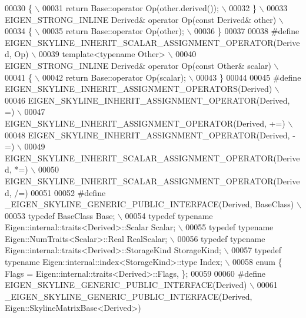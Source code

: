 \begin{DoxyCode}
00030 \textcolor{preprocessor}{\{ \(\backslash\)}
00031 \textcolor{preprocessor}{  return Base::operator Op(other.derived()); \(\backslash\)}
00032 \textcolor{preprocessor}{\} \(\backslash\)}
00033 \textcolor{preprocessor}{EIGEN\_STRONG\_INLINE Derived& operator Op(const Derived& other) \(\backslash\)}
00034 \textcolor{preprocessor}{\{ \(\backslash\)}
00035 \textcolor{preprocessor}{  return Base::operator Op(other); \(\backslash\)}
00036 \textcolor{preprocessor}{\}}
00037 
00038 \textcolor{preprocessor}{#define EIGEN\_SKYLINE\_INHERIT\_SCALAR\_ASSIGNMENT\_OPERATOR(Derived, Op) \(\backslash\)}
00039 \textcolor{preprocessor}{template<typename Other> \(\backslash\)}
00040 \textcolor{preprocessor}{EIGEN\_STRONG\_INLINE Derived& operator Op(const Other& scalar) \(\backslash\)}
00041 \textcolor{preprocessor}{\{ \(\backslash\)}
00042 \textcolor{preprocessor}{  return Base::operator Op(scalar); \(\backslash\)}
00043 \textcolor{preprocessor}{\}}
00044 
00045 \textcolor{preprocessor}{#define EIGEN\_SKYLINE\_INHERIT\_ASSIGNMENT\_OPERATORS(Derived) \(\backslash\)}
00046 \textcolor{preprocessor}{  EIGEN\_SKYLINE\_INHERIT\_ASSIGNMENT\_OPERATOR(Derived, =) \(\backslash\)}
00047 \textcolor{preprocessor}{  EIGEN\_SKYLINE\_INHERIT\_ASSIGNMENT\_OPERATOR(Derived, +=) \(\backslash\)}
00048 \textcolor{preprocessor}{  EIGEN\_SKYLINE\_INHERIT\_ASSIGNMENT\_OPERATOR(Derived, -=) \(\backslash\)}
00049 \textcolor{preprocessor}{  EIGEN\_SKYLINE\_INHERIT\_SCALAR\_ASSIGNMENT\_OPERATOR(Derived, *=) \(\backslash\)}
00050 \textcolor{preprocessor}{  EIGEN\_SKYLINE\_INHERIT\_SCALAR\_ASSIGNMENT\_OPERATOR(Derived, /=)}
00051 
00052 \textcolor{preprocessor}{#define \_EIGEN\_SKYLINE\_GENERIC\_PUBLIC\_INTERFACE(Derived, BaseClass) \(\backslash\)}
00053 \textcolor{preprocessor}{  typedef BaseClass Base; \(\backslash\)}
00054 \textcolor{preprocessor}{  typedef typename Eigen::internal::traits<Derived>::Scalar Scalar; \(\backslash\)}
00055 \textcolor{preprocessor}{  typedef typename Eigen::NumTraits<Scalar>::Real RealScalar; \(\backslash\)}
00056 \textcolor{preprocessor}{  typedef typename Eigen::internal::traits<Derived>::StorageKind StorageKind; \(\backslash\)}
00057 \textcolor{preprocessor}{  typedef typename Eigen::internal::index<StorageKind>::type Index; \(\backslash\)}
00058 \textcolor{preprocessor}{  enum \{  Flags = Eigen::internal::traits<Derived>::Flags, \};}
00059 
00060 \textcolor{preprocessor}{#define EIGEN\_SKYLINE\_GENERIC\_PUBLIC\_INTERFACE(Derived) \(\backslash\)}
00061 \textcolor{preprocessor}{  \_EIGEN\_SKYLINE\_GENERIC\_PUBLIC\_INTERFACE(Derived, Eigen::SkylineMatrixBase<Derived>)}

\end{DoxyCode}
